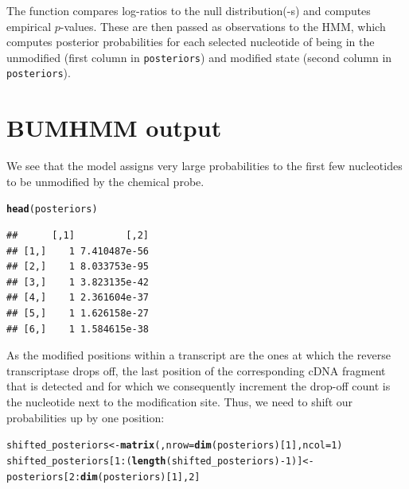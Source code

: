 \documentclass{article}\usepackage[]{graphicx}\usepackage[usenames,dvipsnames]{color}
\makeatletter
\newcommand{\hlnum}[1]{\textcolor[rgb]{0.686,0.059,0.569}{#1}}%
\newcommand{\hlopt}[1]{\textcolor[rgb]{0,0,0}{#1}}%
\newcommand{\hlstd}[1]{\textcolor[rgb]{0.345,0.345,0.345}{#1}}%
\newcommand{\hlkwb}[1]{\textcolor[rgb]{0.69,0.353,0.396}{#1}}%
\newcommand{\hlkwc}[1]{\textcolor[rgb]{0.333,0.667,0.333}{#1}}%
\newcommand{\hlkwd}[1]{\textcolor[rgb]{0.737,0.353,0.396}{\textbf{#1}}}%
\newenvironment{kframe}{%
 \def\at@end@of@kframe{}%
 \ifinner\ifhmode%
  \def\at@end@of@kframe{\end{minipage}}%
  \begin{minipage}{\columnwidth}%
 \fi\fi%
 \def\FrameCommand##1{\hskip\@totalleftmargin \hskip-\fboxsep
 \colorbox{shadecolor}{##1}\hskip-\fboxsep
     \hskip-\linewidth \hskip-\@totalleftmargin \hskip\columnwidth}%
 \MakeFramed {\advance\hsize-\width
   \@totalleftmargin\z@ \linewidth\hsize
   \@setminipage}}%
 {\par\unskip\endMakeFramed%
 \at@end@of@kframe}
\newenvironment{knitrout}{}{} %
\makeatother
\begin{document}
The function  compares log-ratios to the null
distribution(-s) and computes empirical $p$-values. These are then passed as
observations to the HMM, which computes posterior probabilities for each
selected nucleotide of being in the unmodified (first column in
\texttt{posteriors}) and modified state (second column in \texttt{posteriors}).

\section{BUMHMM output}

We see that the model assigns very large probabilities to the first few
nucleotides to be unmodified by the chemical probe.

\begin{knitrout}
\color{fgcolor}\begin{kframe}
\begin{alltt}
\hlkwd{head}\hlstd{(posteriors)}
\end{alltt}
\begin{verbatim}
##      [,1]         [,2]
## [1,]    1 7.410487e-56
## [2,]    1 8.033753e-95
## [3,]    1 3.823135e-42
## [4,]    1 2.361604e-37
## [5,]    1 1.626158e-27
## [6,]    1 1.584615e-38
\end{verbatim}
\end{kframe}
\end{knitrout}

As the modified positions within a transcript are the ones at which the reverse
transcriptase drops off, the last position of the corresponding cDNA fragment
that is detected and for which we consequently increment the drop-off count is
the nucleotide next to the modification site. Thus, we need to shift our
probabilities up by one position:

\begin{knitrout}
\color{fgcolor}\begin{kframe}
\begin{alltt}
\hlstd{shifted_posteriors} \hlkwb{<-} \hlkwd{matrix}\hlstd{(,} \hlkwc{nrow}\hlstd{=}\hlkwd{dim}\hlstd{(posteriors)[}\hlnum{1}\hlstd{],} \hlkwc{ncol}\hlstd{=}\hlnum{1}\hlstd{)}
\hlstd{shifted_posteriors[}\hlnum{1}\hlopt{:}\hlstd{(}\hlkwd{length}\hlstd{(shifted_posteriors)} \hlopt{-} \hlnum{1}\hlstd{)]} \hlkwb{<-}
  \hlstd{posteriors[}\hlnum{2}\hlopt{:}\hlkwd{dim}\hlstd{(posteriors)[}\hlnum{1}\hlstd{],} \hlnum{2}\hlstd{]}
\end{alltt}
\end{kframe}
\end{knitrout}
\end{document}
